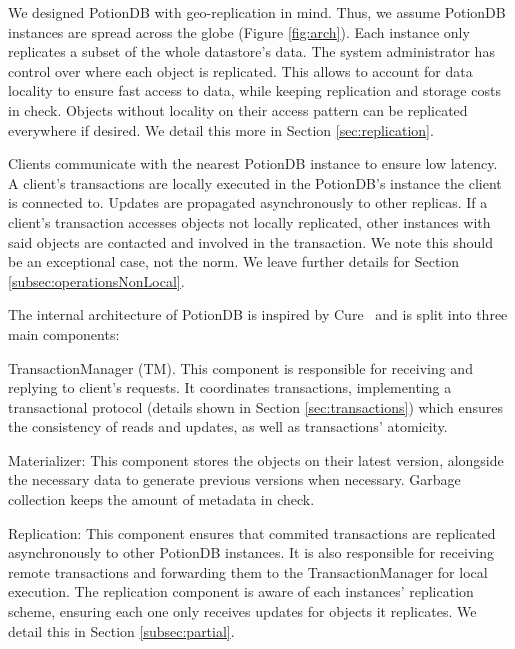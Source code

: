 \documentclass{vldb}
\begin{document}
We designed PotionDB with geo-replication in mind.
Thus, we assume PotionDB instances are spread across the globe (Figure \ref{fig:arch}).
Each instance only replicates a subset of the whole datastore's data.
The system administrator has control over where each object is replicated.
This allows to account for data locality to ensure fast access to data, while keeping replication and storage costs in check.
Objects without locality on their access pattern can be replicated everywhere if desired.
We detail this more in Section \ref{sec:replication}.

Clients communicate with the nearest PotionDB instance to ensure low latency.
A client's transactions are locally executed in the PotionDB's instance the client is connected to.
Updates are propagated asynchronously to other replicas.
If a client's transaction accesses objects not locally replicated, other instances with said objects are contacted and involved in the transaction.
We note this should be an exceptional case, not the norm.
We leave further details for Section \ref{subsec:operationsNonLocal}.

The internal architecture of PotionDB is inspired by Cure~\cite{cure} and is split into three main components:

\begin{compactitem}
	\item TransactionManager (TM). This component is responsible for receiving and replying to client's requests.
	It coordinates transactions, implementing a transactional protocol (details shown in Section \ref{sec:transactions}) which ensures the consistency of reads and updates, as well as transactions' atomicity.
	\item Materializer: This component stores the objects on their latest version, alongside the necessary data to generate previous versions when necessary.
	Garbage collection keeps the amount of metadata in check.
	\item Replication: This component ensures that commited transactions are replicated asynchronously to other PotionDB instances.
	It is also responsible for receiving remote transactions and forwarding them to the TransactionManager for local execution.
	The replication component is aware of each instances' replication scheme, ensuring each one only receives updates for objects it replicates. We detail this in Section \ref{subsec:partial}.
\end{compactitem}
\end{document}
